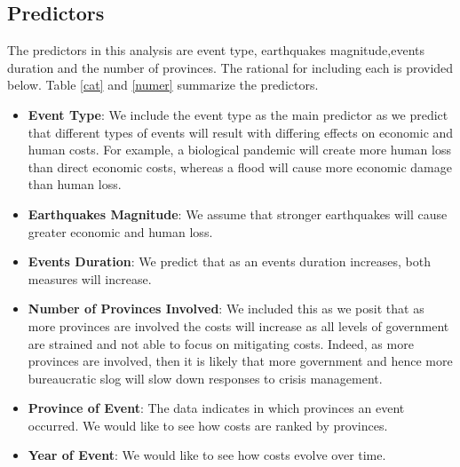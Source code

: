 \subsection{Predictors}
The predictors in this analysis are event type, earthquakes magnitude,events duration and the number of provinces. The rational for including each is provided below.
Table \ref{cat} and \ref{numer} summarize the predictors.
\begin{itemize}
	\item \textbf{Event Type}: We include the event type as the main predictor as we predict that different types of events will result with differing effects on economic and human costs. For example, a biological pandemic will create more human loss than direct economic costs, whereas a flood will cause more economic damage than human loss.
	\item \textbf{Earthquakes Magnitude}: We assume that stronger earthquakes will cause greater economic and human loss.
	\item \textbf{Events Duration}: We predict that as an events duration increases, both measures will increase. 
	\item \textbf{Number of Provinces Involved}: We included this as we posit that as more provinces are involved the costs will increase as all levels of government are strained and not able to focus on mitigating costs. Indeed, as more provinces are involved, then it is likely that more government and hence more bureaucratic slog will slow down responses to crisis management.
	\item \textbf{Province of Event}: The data indicates in which provinces an event occurred. We would like to see how costs are ranked by provinces.
	\item \textbf{Year of Event}: We would like to see how costs evolve over time. 
\end{itemize}
\newpage

















